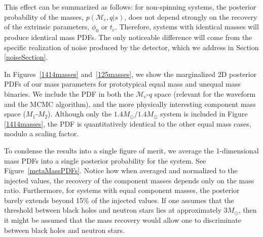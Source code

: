 \documentclass[11pt,a4paper]{emulateapj}
\newcommand{\carl}[1]{{\color{red}  #1}}
\newcommand{\chmass}{\mathcal{M}_c}
\begin{document}
This effect can be summarized as follows: for non-spinning systems, the posterior probability of the masses,
$p(\chmass, q | s)$, does not depend strongly on the recovery of the extrinsic parameters, $\phi_0$ or $t_c$.  Therefore, 
systems with identical masses will produce identical mass PDFs.  The only noticeable difference will come from
 the specific realization of noise produced by the detector, which we address in Section \ref{noiseSection}.




In Figures~\ref{1414masses} and~\ref{125masses}, we show the marginalized 2D posterior PDFs of our
 mass parameters for  prototypical equal mass and unequal mass binaries.  We include the PDF in both
  the $\chmass$-$q$ space (relevant for the waveform and the MCMC algorithm), and the more physically 
  interesting component mass space ($M_1$-$M_2$).  Although only the $1.4M_{\odot}/1.4M_{\odot}$ system
   is included in Figure \ref{1414masses}, the PDF is quantitatively identical to the other equal mass cases, 
   modulo a scaling factor. 

To condense the results into a single figure of merit, we average the 1-dimensional mass PDFs into a single 
posterior probability for the system.  See Figure~\ref{metaMassPDFs}.  Notice how when averaged and
 normalized to the injected values, the recovery of the component masses depends only on the mass ratio.  
 Furthermore, for systems with equal component masses, the posterior barely extends beyond 15\% of the injected values.  
 If one assumes that the threshold between black
   holes and neutron stars lies at approximately $3M_{\odot}$, then it might be assumed that
   the mass recovery would allow one to discriminate between black holes and neutron stars.
   
\end{document}
